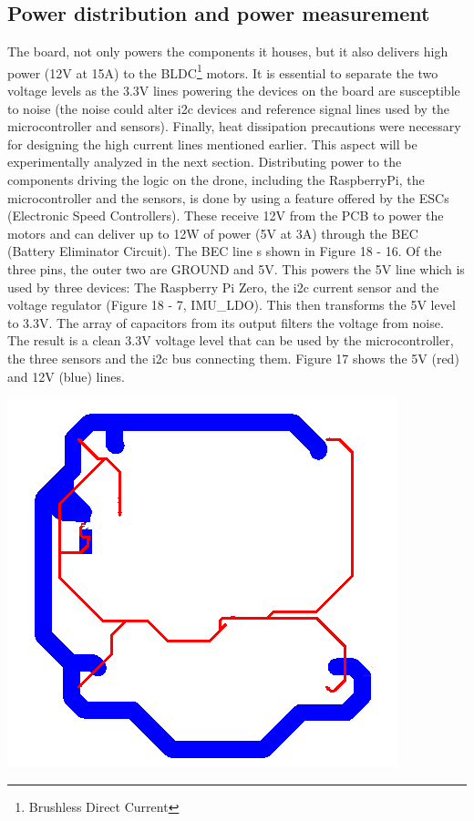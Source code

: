 \documentclass{IEEEtran}
\begin{document}
\subsection*{Power distribution and power measurement}
The board, not only powers the components it houses, but it also delivers high power (12V at 15A) to the BLDC\footnote{Brushless Direct Current} motors. It is essential to separate the two voltage levels as the 3.3V lines powering the devices on the board are susceptible to noise (the noise could alter i2c devices and reference signal lines used by the microcontroller and sensors). Finally, heat dissipation precautions were necessary for designing the high current lines mentioned earlier. This aspect will be experimentally analyzed in the next section.
\newline
\newline
Distributing power to the components driving the logic on the drone, including the RaspberryPi, the microcontroller and the sensors, is done by using a feature offered by the ESCs (Electronic Speed Controllers). These receive 12V from the PCB to power the motors and can deliver up to 12W of power (5V at 3A) through the BEC (Battery Eliminator Circuit). The BEC line s shown in Figure 18 - 16. Of the three pins, the outer two are GROUND and 5V. This powers the 5V line which is used by three devices: The Raspberry Pi Zero, the i2c current sensor and the voltage regulator (Figure 18 - 7, IMU\_LDO). This then transforms the 5V level to 3.3V. The array of capacitors from its output filters the voltage from noise. The result is a clean 3.3V voltage level that can be used by the microcontroller, the three sensors and the i2c bus connecting them. Figure 17 shows the 5V (red) and 12V (blue) lines.
\begin{center}\includegraphics[scale=.35]{power_wires.png}\end{center}
\end{document}
